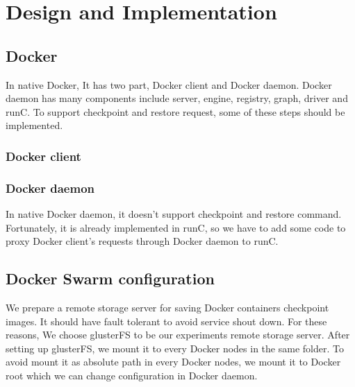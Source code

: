 \chapter{Design and Implementation}
\label{chap:design}
\section{Docker}
In native Docker, It has two part, Docker client and Docker daemon. Docker daemon has many components include server, engine, registry, graph, driver and runC. To  support checkpoint and restore request, some of these steps should be implemented.

\subsection{Docker client}


\subsection{Docker daemon}
In native Docker daemon, it doesn't support checkpoint and restore command.
Fortunately, it is already implemented in runC, so we have to add some code to proxy Docker client's requests through Docker daemon to runC.

\section{Docker Swarm configuration}
We prepare a remote storage server for saving Docker containers checkpoint images. It should have fault tolerant to avoid service shout down. For these reasons, We choose glusterFS to be our experiments remote storage server.                                
After setting up glusterFS, we mount it to every Docker nodes in the same folder. To avoid mount it as absolute path in every Docker nodes, we mount it to Docker root which we can change configuration in Docker daemon.


